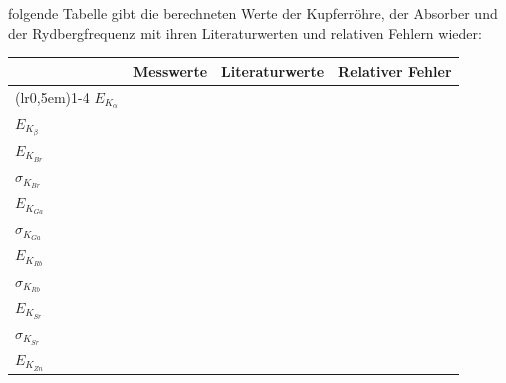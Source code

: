     \justifying folgende Tabelle gibt die berechneten Werte der Kupferröhre, der Absorber und der Rydbergfrequenz mit ihren 
    Literaturwerten und relativen Fehlern wieder:

    \begin{table}[H]
    \centering
        \begin{tabular}{l c c r}
            \toprule
            \multicolumn{1}{c}{} & \multicolumn{1}{c}{Messwerte} & \multicolumn{1}{c}{Literaturwerte} & \multicolumn{1}{c}{Relativer Fehler}\\
            \cmidrule(lr{0,5em}){1-4}
            $E_{K_{\alpha}}$            &             &  \cite{NIST}            &  \\
            $E_{K_{\beta}}$             &             &  \cite{NIST}            &  \\
            $E_{K_{Br}}$                &             &  \cite{NIST}            &  \\
            $\sigma_{K_{Br}}$           &           &                       &  \\
            $E_{K_{Ga}}$                &             &  \cite{NIST}            &  \\
            $\sigma_{K_{Ga}}$           &           &                       &  \\
            $E_{K_{Rb}}$                &             &  \cite{NIST}            &  \\
            $\sigma_{K_{Rb}}$           &           &                       &  \\
            $E_{K_{Sr}}$                &             &  \cite{NIST}            &  \\
            $\sigma_{K_{Sr}}$           &           &                       &  \\
            $E_{K_{Zn}}$                &             &  \cite{NIST}            &  \\

\end{tabular}
\end{table}
